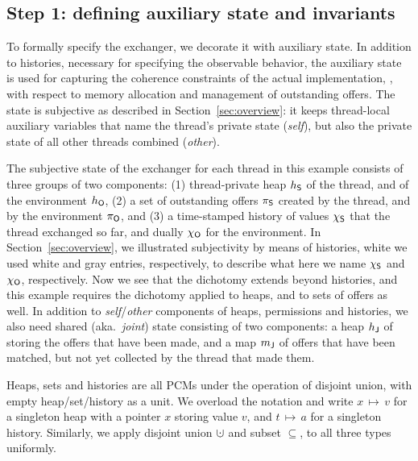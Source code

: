 \subsection{Step 1: defining auxiliary state and invariants}

%
%

To formally specify the exchanger, we decorate it with auxiliary
state. 
%
In addition to histories, necessary for specifying the observable
behavior, the auxiliary state is used for capturing the coherence
constraints of the actual implementation, \eg, with respect to memory
allocation and management of outstanding offers.
%
The state is subjective as described in Section~\ref{sec:overview}: it
keeps thread-local auxiliary variables that name the thread's private
state (\emph{self}), but also the private state of all other threads
combined (\emph{other}).
%

The subjective state of the exchanger for each thread in this example
consists of three groups of two components: (1) thread-private heap
$h_{\mathsf{S}}$ of the thread, and of the environment $h_{\mathsf{O}}$, (2) a set of
outstanding offers $\pi_{\mathsf{S}}$ created by the thread, and by the
environment $\pi_{\mathsf{O}}$, and (3) a time-stamped history of values
$\chi_{\mathsf{S}}$ that the thread exchanged so far, and dually $\chi_{\mathsf{O}}$ for the
environment. In Section~\ref{sec:overview}, we illustrated
subjectivity by means of histories, white we used white and gray
entries, respectively, to describe what here we name $\chi_{\mathsf{S}}$ and
$\chi_{\mathsf{O}}$, respectively. Now we see that the dichotomy extends beyond
histories, and this example requires the dichotomy applied to heaps,
and to sets of offers as well. In addition to \emph{self}/\emph{other}
components of heaps, permissions and histories, we also need shared
(aka.~\emph{joint}) state consisting of two components: a heap
$h_{\mathsf{J}}$ of storing the offers that have been made, and a map
${m_{\mathsf{J}}}$ of offers that have been matched, but not yet collected by
the thread that made them.

Heaps, sets and histories are all PCMs under the operation of disjoint
union, with empty heap/set/history as a unit. We overload the notation
and write $x\,{\mapsto}\,v$ for a singleton heap with a pointer $x$
storing value $v$, and $t\,{\mapsto}\,a$ for a singleton
history. Similarly, we apply disjoint union $\hunion$ and subset
$\subseteq$, to all three types uniformly.

